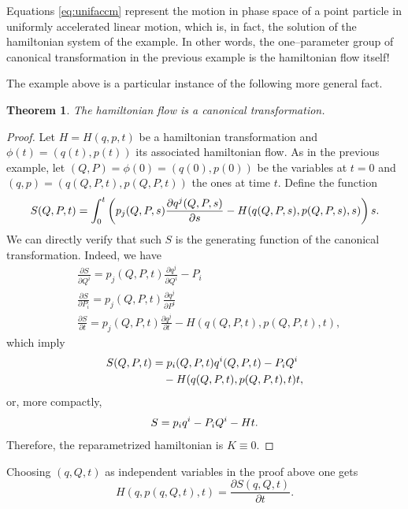 \documentclass[english,fontsize=11pt,paper=a5,oneside]{scrbook}
\let\d\relax
\DeclareMathOperator{\d}{d}
\newtheorem{theorem}{Theorem}[chapter]
\theoremstyle{definition}
\newenvironment{remark}
  {\pushQED{\qed}\renewcommand{\qedsymbol}{$\lozenge$}\remarkx}
  {\popQED\endremarkx}
\begin{document}
Equations \eqref{eq:unifaccm} represent the motion in phase space of a point particle in uniformly accelerated linear motion, which is, in fact, the solution of the hamiltonian system of the example.
In other words, the one--parameter group of canonical transformation in the previous example is the hamiltonian flow itself!

The example above is a particular instance of the following more general fact.

\begin{theorem}
    The hamiltonian flow is a canonical transformation.
\end{theorem}
\begin{proof}
    Let $H = H(q,p,t)$ be a hamiltonian transformation and $\phi(t) = (q(t), p(t))$ its associated hamiltonian flow.
    As in the previous example, let $(Q, P) = \phi(0) = (q(0), p(0))$ be the variables at $t=0$ and $(q, p) = (q(Q,P,t), p(Q,P,t))$ the ones at time $t$. Define the function
    \begin{equation}
        S(Q,P,t) = \int_0^t\left(
            p_j(Q,P,s)\frac{\partial q^j(Q,P,s)}{\partial s} - H(q(Q,P,s), p(Q,P,s), s)
            \right)\d s.
    \end{equation}
    We can directly verify that such $S$ is the generating function of the canonical transformation. Indeed, we have
    \begin{align}
        &\frac{\partial S}{\partial Q^i} = p_j(Q,P,t) \frac{\partial q^j}{\partial Q^i} - P_i\\
        &\frac{\partial S}{\partial P_i} = p_j(Q,P,t) \frac{\partial q^j}{\partial P^i}\\
        &\frac{\partial S}{\partial t} = p_j(Q,P,t) \frac{\partial q^j}{\partial t} - H(q(Q,P,t), p(Q,P,t), t),
    \end{align}
    which imply
    \begin{align}
        \d S(Q, P, t) &= p_i(Q, P, t) \d q^i (Q, P, t) - P_i \d Q^i \\
        &\quad - H(q(Q,P,t), p(Q,P,t), t) \d t,
    \end{align}
    or, more compactly,
    \begin{equation}
        \d S = p_i \d q^i - P_i \d Q^i - H \d t.
    \end{equation}
    Therefore, the reparametrized hamiltonian is $K\equiv 0$.
\end{proof}

\begin{remark}\label{rmk:genfnhamflowct}
    Choosing $(q,Q,t)$ as independent variables in the proof above one gets
    \begin{equation}
        H(q, p(q,Q,t), t) = \frac{\partial S(q,Q,t)}{\partial t}.
    \end{equation}
\end{remark}
\end{document}
